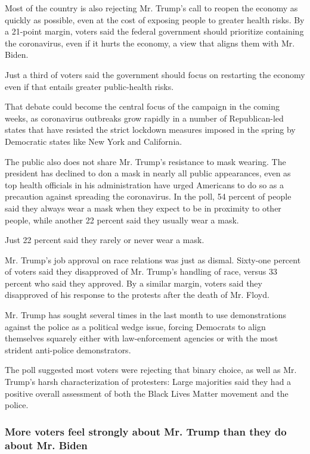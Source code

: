 Most of the country is also rejecting Mr. Trump's call to reopen the
economy as quickly as possible, even at the cost of exposing people to
greater health risks. By a 21-point margin, voters said the federal
government should prioritize containing the coronavirus, even if it
hurts the economy, a view that aligns them with Mr. Biden.

Just a third of voters said the government should focus on restarting
the economy even if that entails greater public-health risks.

That debate could become the central focus of the campaign in the coming
weeks, as coronavirus outbreaks grow rapidly in a number of
Republican-led states that have resisted the strict lockdown measures
imposed in the spring by Democratic states like New York and California.

The public also does not share Mr. Trump's resistance to mask wearing.
The president has declined to don a mask in nearly all public
appearances, even as top health officials in his administration have
urged Americans to do so as a precaution against spreading the
coronavirus. In the poll, 54 percent of people said they always wear a
mask when they expect to be in proximity to other people, while another
22 percent said they usually wear a mask.

Just 22 percent said they rarely or never wear a mask.

Mr. Trump's job approval on race relations was just as dismal. Sixty-one
percent of voters said they disapproved of Mr. Trump's handling of race,
versus 33 percent who said they approved. By a similar margin, voters
said they disapproved of his response to the protests after the death of
Mr. Floyd.

Mr. Trump has sought several times in the last month to use
demonstrations against the police as a political wedge issue, forcing
Democrats to align themselves squarely either with law-enforcement
agencies or with the most strident anti-police demonstrators.

The poll suggested most voters were rejecting that binary choice, as
well as Mr. Trump's harsh characterization of protesters: Large
majorities said they had a positive overall assessment of both the Black
Lives Matter movement and the police.

\hypertarget{more-voters-feel-strongly-about-mr-trump-than-they-do-about-mr-biden}{%
\subsubsection{More voters feel strongly about Mr. Trump than they do
about Mr.
Biden}\label{more-voters-feel-strongly-about-mr-trump-than-they-do-about-mr-biden}}

